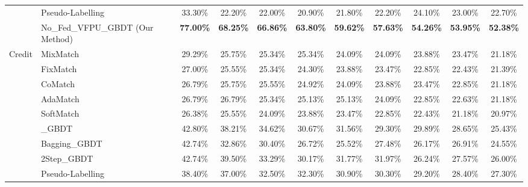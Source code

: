 \begin{table}[h]
{{\begin{tabular}{llccccccccc}
				& Pseudo-Labelling                 & 33.30\%          & 22.20\%          & 22.00\%          & 20.90\%          & 21.80\%          & 22.20\%          & 24.10\%          & 23.00\%          & 22.70\%           \\
				& No\_Fed\_VFPU\_GBDT (Our Method) & \textbf{77.00\%} & \textbf{68.25\%} & \textbf{66.86\%} & \textbf{63.80\%} & \textbf{59.62\%} & \textbf{57.63\%} & \textbf{54.26\%} & \textbf{53.95\%} & \textbf{52.38\%}  \\ 
				\hline
				\multirow{10}{*}{Credit} & MixMatch                         & 29.29\%          & 25.75\%          & 25.34\%          & 25.34\%          & 24.09\%          & 24.09\%          & 23.88\%          & 23.47\%          & 21.18\%           \\
				& FixMatch                         & 27.00\%          & 25.55\%          & 25.34\%          & 24.30\%          & 23.88\%          & 23.47\%          & 22.85\%          & 22.43\%          & 21.39\%           \\
				& CoMatch                          & 26.79\%          & 25.75\%          & 25.55\%          & 24.92\%          & 24.09\%          & 23.88\%          & 23.47\%          & 22.85\%          & 21.18\%           \\
				& AdaMatch                         & 26.79\%          & 26.79\%          & 25.34\%          & 25.13\%          & 25.13\%          & 24.09\%          & 22.85\%          & 22.63\%          & 21.18\%           \\
				& SoftMatch                        & 26.38\%          & 25.55\%          & 24.09\%          & 23.88\%          & 23.47\%          & 22.85\%          & 22.43\%          & 21.18\%          & 20.97\%           \\
				& \_GBDT                           & 42.80\%          & 38.21\%          & 34.62\%          & 30.67\%          & 31.56\%          & 29.30\%          & 29.89\%          & 28.65\%          & 25.43\%           \\
				& Bagging\_GBDT                    & 42.74\%          & 32.86\%          & 30.40\%          & 26.72\%          & 25.52\%          & 27.48\%          & 26.17\%          & 26.91\%          & 24.55\%           \\
				& 2Step\_GBDT                      & 42.74\%          & 39.50\%          & 33.29\%          & 30.17\%          & 31.77\%          & 31.97\%          & 26.24\%          & 27.57\%          & 26.00\%           \\
				& Pseudo-Labelling                 & 38.40\%          & 37.00\%          & 32.50\%          & 32.30\%          & 30.90\%          & 30.30\%          & 29.20\%          & 28.40\%          & 27.30\%           \\

\end{tabular}}}
\end{table}
